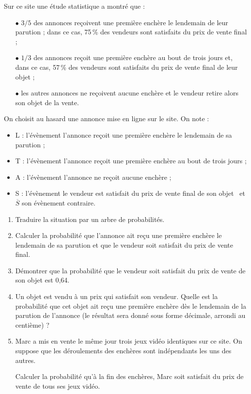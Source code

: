 \documentclass[a4paper,11pt]{article}
\begin{document}
Sur ce site une étude statistique a montré que :
\begin{itemize}[]
	\item[$\bullet$] $3/5$ des annonces reçoivent une première enchère le lendemain de leur parution ; dans  ce cas, 75\,\% des vendeurs sont satisfaits du prix de vente final ;
	\item[$\bullet$] $1/3$ des annonces reçoit une première enchère au bout de trois jours et, dans ce cas, 57\,\% des vendeurs sont satisfaits du prix de vente final de leur objet ;
	\item[$\bullet$] les autres annonces ne reçoivent aucune enchère et le vendeur retire alors son objet de la vente. 
\end{itemize}
On choisit au hasard une annonce mise en ligne sur le site. On note :
\begin{itemize}[topsep=1pt]
	\item L : l'évènement \og l'annonce reçoit une première enchère le lendemain de sa parution \fg ; 
	\item T : l'évènement \og  l'annonce reçoit une première enchère au bout de trois jours \fg ; 
	\item A : l'évènement \og l'annonce ne reçoit aucune enchère \fg ; 
	\item S : l'évènement \og le vendeur est satisfait du prix de vente final de son objet \fg ~et $\overline{S}$ son évènement contraire. 
\end{itemize}
%
\begin{enumerate}
	\item Traduire la situation par un arbre de probabilités. 
	\item Calculer la probabilité que l'annonce ait reçu une première enchère le lendemain de sa parution et que le vendeur soit satisfait du prix de vente final. 
	\item Démontrer que la probabilité que le vendeur soit satisfait du prix de vente de son objet est 0,64. 
	\item Un objet est vendu à un prix qui satisfait son vendeur. Quelle est la probabilité que cet objet ait reçu une première enchère dès le lendemain de la parution de l'annonce (le résultat sera donné sous forme décimale, arrondi au centième) ? 
	\item Marc a mis en vente le même jour trois jeux vidéo identiques sur ce site. On suppose que les déroulements des enchères sont indépendants les uns des autres.
	
	Calculer la probabilité qu'à la fin des enchères, Marc soit  satisfait du prix de vente de tous ses jeux vidéo. 
\end{enumerate}
\end{document}
